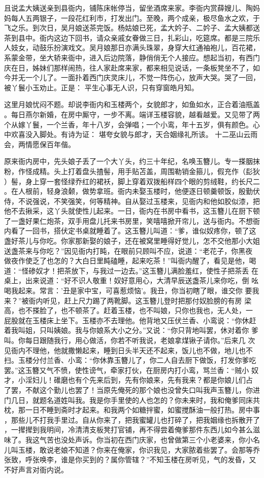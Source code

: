 且说孟大姨送亲到县衙内，铺陈床帐停当，留坐酒席来家。李衙内赏薛嫂儿、陶妈
妈每人五两银子，一段花红利市，打发出门。至晚，两个成亲，极尽鱼水之欢，于
飞之乐。到次日，吴月娘送茶完饭。杨姑娘已死，孟大妗子、二妗子、孟大姨都送
茶到县中。衙内这边下回书，请众亲戚女眷做三日，扎彩山，吃筵席。都是三院乐
人妓女，动鼓乐扮演戏文。吴月娘那日亦满头珠翠，身穿大红通袖袍儿，百花裙，
系蒙金带，坐大轿来衙中，进入后边院落，静俏俏无个人接应。想起当初，有西门
庆在日，姊妹们那样闹热，往人家赴席来家，都来相见说话，一条板凳坐不了，如
今并无一个儿了。一面扑着西门庆灵床儿，不觉一阵伤心，放声大哭。哭了一回，
被丫鬟小玉劝止。正是：
平生心事无人识，只有穿窗皓月知。

这里月娘忧闷不题。却说李衙内和玉楼两个，女貌郎才，如鱼如水，正合着油瓶盖
。每日燕尔新婚，在房中厮守，一步不离。端详玉楼容貌，越看越爱。又见带了两
个从嫁丫鬟，一个兰香，年十八岁，会弹唱；一个小鸾，年十五岁，俱有颜色。心
中欢喜没入脚处。有诗为证：
堪夸女貌与郎才，天合姻缘礼所该。
十二巫山云雨会，两情愿保百年偕。

原来衙内房中，先头娘子丢了一个大丫头，约三十年纪，名唤玉簪儿。专一搽胭抹
粉，作怪成精。头上打着盘头揸髻，用手贴苫盖，周围勒销金箍儿，假充作（髟狄
）髻，身上穿一套怪绿乔红的裙袄，脚上穿着双拨船样四个眼的剪绒鞋，约长尺二
。在人根前，轻身浪颡，做势拿班。衙内未娶玉楼时，他便逐日顿羹顿饭，殷勤伏
侍，不说强说，不笑强笑，何等精神。自从娶过玉楼来，见衙内和他如胶似漆，把
他不去揪采，这丫头就使性儿起来。一日，衙内在书房中看书，这玉簪儿在厨下顿
了一盏好果仁炮茶，双手用盘儿托来书房里，笑嘻嘻掀开帘儿，送与衙内。不想衙
内看了一回书，搭伏定书桌就睡着了。这玉簪儿叫道：“爹，谁似奴疼你，顿了这
盏好茶儿与你吃。你家那新娶的娘子，还在被窝里睡得好觉儿，怎不交他那小大姐
送盏茶来与你吃？”因见衙内打盹，在眼前只顾叫不应，说道：“老花子，你黑夜
做夜作使乏了也怎的？大白日里盹磕睡，起来吃茶！”叫衙内醒了，看见是他，喝
道：“怪碜奴才！把茶放下，与我过一边去。”这玉簪儿满脸羞红，使性子把茶丢
在桌上，出来说道：“好不识人敬重！奴好意用心，大清早辰送盏茶儿来你吃，倒
吆喝我起来。常言：'丑是家中宝，可喜惹烦恼'。我丑，你当初瞎了眼，谁交你
要我来？”被衙内听见，赶上尺力踢了两靴脚。这玉簪儿登时把那付奴脸膀的有房
梁高，也不搽脸了，也不顿茶了。赶着玉楼，也不叫娘，只你也我也，无人处，一
屁股就在玉楼床上坐下。玉楼亦不去理他。他背地又压伏兰香、小鸾说：“你休赶
着我叫姐，只叫姨娘。我与你娘系大小之分。”又说：“你只背地叫罢，休对着你
爹叫。你每日跟随我行，用心做活，你若不听我说，老娘拿煤锹子请你。”后来几
次见衙内不理他，他就撒懒起来，睡到日头半天还不起来，饭儿也不做，地儿也不
扫。玉楼分付兰香、小鸾：“你休靠玉簪儿了，你二人自去厨下做饭，打发你爹吃
罢。”这玉簪又气不愤，使性谤气，牵家打伙，在厨房内打小鸾，骂兰香：“贼小
奴才，小淫妇儿！碓磨也有个先来后到，先有你娘来，先有我来？都是你娘儿们占
了罢，不献这个勤儿也罢了！当原先俺死的那个娘也没曾失口叫我声玉簪儿，你进
门几日，就题名道姓叫我。我是你手里使的人也怎的？你未来时，我和俺爹同床共
枕，那一日不睡到斋时才起来。和我两个如糖拌蜜，如蜜搅酥油一般打热。房中事
，那些儿不打我手里过。自从你来了，把我蜜罐儿也打碎了，把我姻缘也拆散开了
，一撵撵到我明间，冷清清支板凳打官铺，再不得尝着俺爹那件东西儿如今甚么滋
味了。我这气苦也没处声诉。你当初在西门庆家，也曾做第三个小老婆来，你小名
儿叫玉楼，敢说老娘不知道？你来在俺家，你识我见，大家脓着些罢了。会那等乔
张致，呼张唤李，谁是你买到的？属你管辖？”不知玉楼在房听见，气的发昏，又
不好声言对衙内说。

